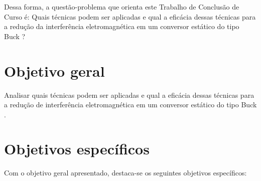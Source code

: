        
        Dessa forma, a questão-problema que orienta este Trabalho de Conclusão de Curso é: Quais técnicas podem ser aplicadas e qual a eficácia dessas técnicas para a redução da interferência eletromagnética em um conversor estático do tipo Buck \interleaved?
        
    
    \section{Objetivo geral}
    
        Analisar quais técnicas podem ser aplicadas e qual a eficácia dessas técnicas para a redução de interferência eletromagnética em um conversor estático do tipo Buck \interleaved.
    
    
    \section{Objetivos específicos}
    
        Com o objetivo geral apresentado, destaca-se os seguintes objetivos específicos: 
    
